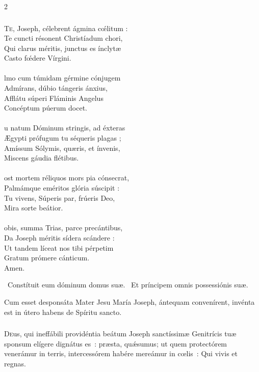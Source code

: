 \documentclass[9pt,twoside]{extarticle}
\begin{document}
\begin{multicols}{2}
{{\subsubsection*{\center {}}
\lettrine{T}e, Joseph, célebrent ágmina cœ́litum :\\
Te cuncti résonent Christíadum chori,\\
Qui clarus méritis, junctus es ínclytæ\\
Casto fœ́dere Vírgini.\\
\\
lmo cum túmidam gérmine cónjugem\\
Admírans, dúbio tángeris ánxius,\\
Afflátu súperi Fláminis Angelus\\
Concéptum púerum docet.\\
\\
u natum Dóminum stringis, ad éxteras\\
Ægypti prófugum tu séqueris plagas ;\\
Amíssum Sólymis, quæris, et ínvenis,\\
Miscens gáudia flétibus.\\
\\
ost mortem réliquos mors pia cónsecrat,\\
Palmámque eméritos glória súscipit :\\
Tu vivens, Súperis par, frúeris Deo,\\
Mira sorte beátior.\\
\\
obis, summa Trias, parce precántibus,\\
Da Joseph méritis sídera scándere :\\
Ut tandem líceat nos tibi pérpetim\\
Gratum prómere cánticum.\\
Amen.

\begin{tightlist}{}
\item {}~Constítuit eum dóminum domus suæ. ~Et príncipem omnis possessiónis suæ.
\item {} Cum esset desponsáta Mater Jesu María Joseph, ántequam convenírent, invénta est in útero habens de Spíritu sancto.
\end{tightlist}

\subsubsection*{\center {}}
\lettrine{D}eus, qui ineffábili providéntia beátum Joseph sanctíssimæ Genitrícis tuæ sponsum elígere dignátus es~: præsta, quǽsumus; ut quem protectórem venerámur in terris, intercessórem habére mereámur in cœlis~: Qui vivis et regnas.

}}
\end{multicols}
\end{document}
